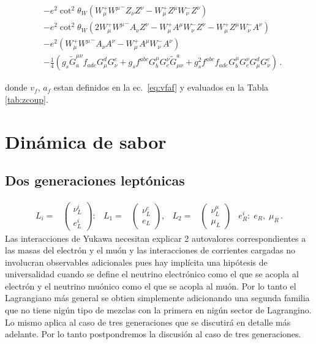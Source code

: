 \begin{frame}
\begin{align*}
&-e^2\cot^2\theta_W\left(W_\mu^+{W^\mu}^-Z_\nu Z^\nu-W_\mu^+Z^\mu W_\nu^-Z^\nu\right)\nonumber\\
&-e^2\cot^2\theta_W\left(2W_\mu^+{W^\mu}^-A_\nu Z^\nu-W_\mu^+A^\mu W_\nu^-Z^\nu-W_\mu^+Z^\mu W_\nu^-A^\nu\right)\nonumber\\
&-e^2\left(W_\mu^+{W^\mu}^-A_\nu A^\nu-W_\mu^+A^\mu W_\nu^-A^\nu\right)\nonumber\\
&- \frac{1}{4}\left(g_s\widetilde{G}^{\mu\nu}_af_{a d e}G^d_\mu G^e_\nu
    +g_sf^{a b c}G_b^\mu G_c^\nu\widetilde{G}_{\mu\nu}^a
    +g_s^2f^{a b c}f_{a d e}G_b^\mu G_c^\nu G^d_\mu G^e_\nu\right)\,.
\end{align*}     
\end{frame}
\noindent
donde  $v_f$, $a_f$ estan definidos en la ec.~\eqref{eq:vfaf} y evaluados en la Tabla \ref{tab:zcoup}.
\section{Dinámica de sabor}
\label{sec:dinamica-de-sabor}

\subsection{Dos generaciones leptónicas}
\begin{align}
L_i=&
\begin{pmatrix}
  \nu^i_L\\
  e^i_L
\end{pmatrix}:&
  L_1=&
  \begin{pmatrix}
    \nu^e_L\\
    e_L
  \end{pmatrix},&  L_2=&
  \begin{pmatrix}
    \nu^\mu_L\\
    \mu_L
  \end{pmatrix}&  e_R^i:\;e_R,\;\mu_R\,.
\end{align}
Las interacciones de Yukawa necesitan explicar 2 autovalores correspondientes a las masas del electrón y el muón y las interacciones de corrientes cargadas no involucran observables adicionales pues hay implícita una hipótesis de universalidad cuando se define el neutrino electrónico como el que se acopla al electrón y el neutrino muónico como el que se acopla al muón. Por lo tanto el Lagrangiano más general se obtien simplemente  adicionando una segunda familia que no tiene nigún tipo de mezclas con la primera en nigún sector de Lagrangino. Lo mismo aplica al caso de tres generaciones que se discutirá en detalle más adelante. Por lo tanto postpondremos la discusión al caso de tres generaciones.

